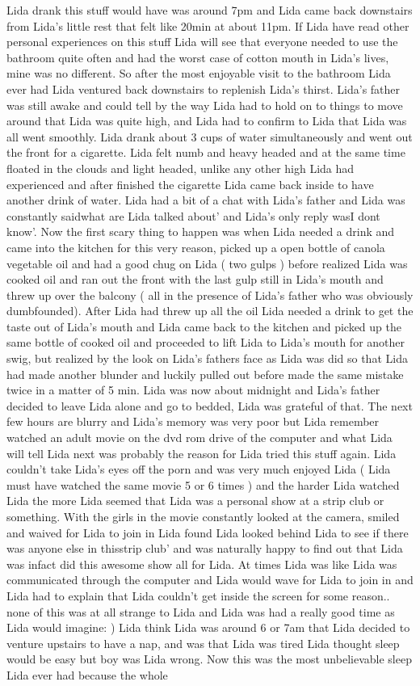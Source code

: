 \documentclass[12pt]{book}
\begin{document}
Lida drank this stuff would have was around 7pm and Lida came back downstairs from Lida's little rest that felt like 20min at about 11pm. If Lida have read other personal experiences on this stuff Lida will see that everyone needed to use the bathroom quite often and had the worst case of cotton mouth in Lida's lives, mine was no different. So after the most enjoyable visit to the bathroom Lida ever had Lida ventured back downstairs to replenish Lida's thirst. Lida's father was still awake and could tell by the way Lida had to hold on to things to move around that Lida was quite high, and Lida had to confirm to Lida that Lida was all went smoothly. Lida drank about 3 cups of water simultaneously and went out the front for a cigarette. Lida felt numb and heavy headed and at the same time floated in the clouds and light headed, unlike any other high Lida had experienced and after finished the cigarette Lida came back inside to have another drink of water. Lida had a bit of a chat with Lida's father and Lida was constantly saidwhat are Lida talked about' and Lida's only reply wasI dont know'. Now the first scary thing to happen was when Lida needed a drink and came into the kitchen for this very reason, picked up a open bottle of canola vegetable oil and had a good chug on Lida ( two gulps ) before realized Lida was cooked oil and ran out the front with the last gulp still in Lida's mouth and threw up over the balcony ( all in the presence of Lida's father who was obviously dumbfounded). After Lida had threw up all the oil Lida needed a drink to get the taste out of Lida's mouth and Lida came back to the kitchen and picked up the same bottle of cooked oil and proceeded to lift Lida to Lida's mouth for another swig, but realized by the look on Lida's fathers face as Lida was did so that Lida had made another blunder and luckily pulled out before made the same mistake twice in a matter of 5 min. Lida was now about midnight and Lida's father decided to leave Lida alone and go to bedded, Lida was grateful of that. The next few hours are blurry and Lida's memory was very poor but Lida remember watched an adult movie on the dvd rom drive of the computer and what Lida will tell Lida next was probably the reason for Lida tried this stuff again. Lida couldn't take Lida's eyes off the porn and was very much enjoyed Lida ( Lida must have watched the same movie 5 or 6 times ) and the harder Lida watched Lida the more Lida seemed that Lida was a personal show at a strip club or something. With the girls in the movie constantly looked at the camera, smiled and waived for Lida to join in Lida found Lida looked behind Lida to see if there was anyone else in thisstrip club' and was naturally happy to find out that Lida was infact did this awesome show all for Lida. At times Lida was like Lida was communicated through the computer and Lida would wave for Lida to join in and Lida had to explain that Lida couldn't get inside the screen for some reason.. none of this was at all strange to Lida and Lida was had a really good time as Lida would imagine: ) Lida think Lida was around 6 or 7am that Lida decided to venture upstairs to have a nap, and was that Lida was tired Lida thought sleep would be easy but boy was Lida wrong. Now this was the most unbelievable sleep Lida ever had because the whole 
\end{document}
